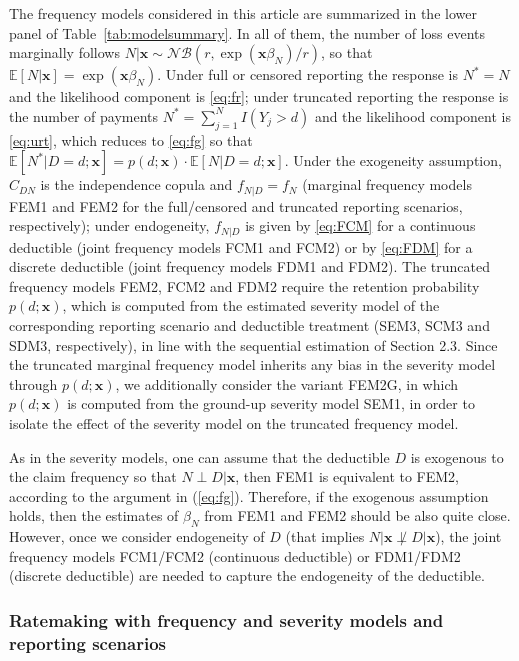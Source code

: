 \documentclass[11pt]{article}
\newcommand{\rev}[1]{{\color{blue}#1}}
\begin{document}
\rev{The frequency models considered in this article are summarized in the lower panel of Table~\ref{tab:modelsummary}. In all of them, the number of loss events marginally follows $N|\bm{x} \sim \mathcal{NB}(r, \exp(\bm{x}\beta_{N}) /r)$, so that $\mathbb{E}[N|\bm{x}]=\exp(\bm{x}\beta_{N})$. Under full or censored reporting the response is $N^*=N$ and the likelihood component is \eqref{eq:fr}; under truncated reporting the response is the number of payments $N^*=\sum_{j=1}^{N} I(Y_{j}>d)$ and the likelihood component is \eqref{eq:urt}, which reduces to \eqref{eq:fg} so that $\mathbb{E}[N^*|D=d; \bm{x}]=p(d;\bm{x}) \cdot \mathbb{E}[N|D=d;\bm{x}]$. Under the exogeneity assumption, $C_{DN}$ is the independence copula and $f_{N|D}=f_{N}$ (marginal frequency models FEM1 and FEM2 for the full/censored and truncated reporting scenarios, respectively); under endogeneity, $f_{N|D}$ is given by \eqref{eq:FCM} for a continuous deductible (joint frequency models FCM1 and FCM2) or by \eqref{eq:FDM} for a discrete deductible (joint frequency models FDM1 and FDM2). The truncated frequency models FEM2, FCM2 and FDM2 require the retention probability $p(d;\bm{x})$, which is computed from the estimated severity model of the corresponding reporting scenario and deductible treatment (SEM3, SCM3 and SDM3, respectively), in line with the sequential estimation of Section 2.3. Since the truncated marginal frequency model inherits any bias in the severity model through $p(d;\bm{x})$, we additionally consider the variant FEM2G, in which $p(d;\bm{x})$ is computed from the ground-up severity model SEM1, in order to isolate the effect of the severity model on the truncated frequency model.}

As in the severity models, one can assume that the deductible $D$ is exogenous to the claim frequency so that \rev{$N \perp D|\bm{x}$}, then FEM1 is equivalent to 
FEM2, %
according to the argument in (\ref{eq:fg}). Therefore, if the exogenous assumption holds, then the estimates of $\beta_{N}$ from FEM1 and FEM2 should be also quite close. However, once we consider endogeneity of $D$ (that implies \rev{$N|\bm{x} \not\perp D|\bm{x}$}), \rev{the joint frequency models FCM1/FCM2 (continuous deductible) or FDM1/FDM2 (discrete deductible) are needed to capture the endogeneity of the deductible.}

\subsubsection{Ratemaking with frequency and severity models and reporting scenarios}
\end{document}

